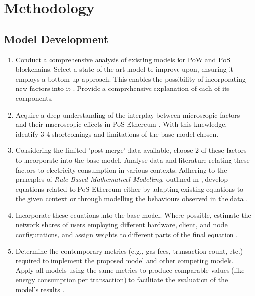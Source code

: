 \chapter {Methodology}

\section{Model Development}
\label{MethodologySteps}
\begin{enumerate}
    \item Conduct a comprehensive analysis of existing models for PoW and PoS blockchains. Select a state-of-the-art model to improve upon, ensuring it employs a bottom-up approach. This enables the possibility of incorporating new factors into it \cite{CambridgeCBECI}. Provide a comprehensive explanation of each of its components.

    \item Acquire a deep understanding of the interplay between microscopic factors and their macroscopic effects in PoS Ethereum \cite{MarionAnModelling}. With this knowledge, identify 3-4 shortcomings and limitations of the base model chosen.

    \item Considering the limited 'post-merge' data available, choose 2 of these factors to incorporate into the base model. Analyse data and literature relating these factors to electricity consumption in various contexts. Adhering to the principles of \textit{Rule-Based Mathematical Modelling}, outlined in , develop equations related to PoS Ethereum either by adapting existing equations to the given context or through modelling the behaviours observed in the data \cite{CryptoCarbonRatingsInstitute2022TheNetwork}.

    \item Incorporate these equations into the base model. Where possible, estimate the network shares of users employing different hardware, client, and node configurations, and assign weights to different parts of the final equation \cite{CCRI:Institute}.

    \item Determine the contemporary metrics (e.g., gas fees, transaction count, etc.) required to implement the proposed model and other competing models. Apply all models using the same metrics to produce comparable values (like energy consumption per transaction) to facilitate the evaluation of the model's results \cite{CryptoCarbonRatingsInstitute2022TheNetwork}.

\end{enumerate}

